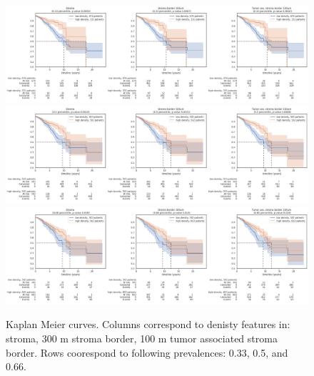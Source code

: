 \begin{figure}[h!]
\includegraphics[width=\linewidth]{figures/survival/km_33.png}
\includegraphics[width=\linewidth]{figures/survival/km_50.png}
\includegraphics[width=\linewidth]{figures/survival/km_66.png}
\caption{Kaplan Meier curves. Columns correspond to denisty features in: stroma, 300 \textmu m stroma border,
100 \textmu m tumor associated stroma border. Rows coorespond to following prevalences: 0.33, 0.5, and 0.66.}
\label{fig:km}
\end{figure}

